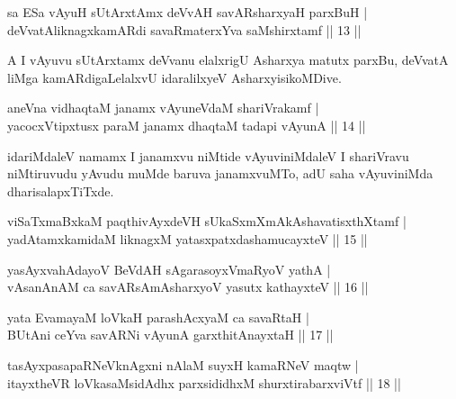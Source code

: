 
\begin{shl}
sa ESa vAyuH sUtArxtAmx deVvAH savARsharxyaH parxBuH |\\
deVvatAliknagxkamARdi savaRmaterxYva saMshirxtamf \hfill || 13 ||
\end{shl}

\begin{artha}
A I vAyuvu sUtArxtamx deVvanu elalxrigU Asharxya matutx parxBu, deVvatA liMga kamARdigaLelalxvU idaralilxyeV AsharxyisikoMDive.
\end{artha}


\begin{shl}
aneVna vidhaqtaM janamx vAyuneVdaM shariVrakamf |\\
yacocxVtipxtusx paraM janamx dhaqtaM tadapi vAyunA \hfill || 14 ||
\end{shl}

\begin{artha}
idariMdaleV namamx I janamxvu niMtide vAyuviniMdaleV I shariVravu niMtiruvudu yAvudu muMde baruva janamxvuMTo, adU saha vAyuviniMda dharisalapxTiTxde.
\end{artha}

\begin{shl}
viSaTxmaBxkaM paqthivAyxdeVH sUkaSxmXmAkAshavatisxthXtamf |\\
yadAtamxkamidaM liknagxM yatasxpatxdashamucayxteV \hfill || 15 ||
\end{shl}

\begin{shl}
yasAyx\s \s vahAdayoV BeVdAH sAgarasoyxVmaRyoV yathA |\\
vAsanAnAM ca savARsAmAsharxyoV yasutx kathayxteV \hfill || 16 ||
\end{shl}

\begin{shl}
yata EvamayaM loVkaH parashAcxyaM ca savaRtaH |\\
BUtAni ceYva savARNi vAyunA garxthitAnayxtaH \hfill || 17 ||
\end{shl}

\begin{shl}
tasAyxpasapaRNeV\s knAgxni nAlaM suyxH kamaRNeV maqtw |\\
itayxtheVR loVkasaMsidAdhx parxsididhxM shurxtirabarxviVtf \hfill || 18 ||
\end{shl}

